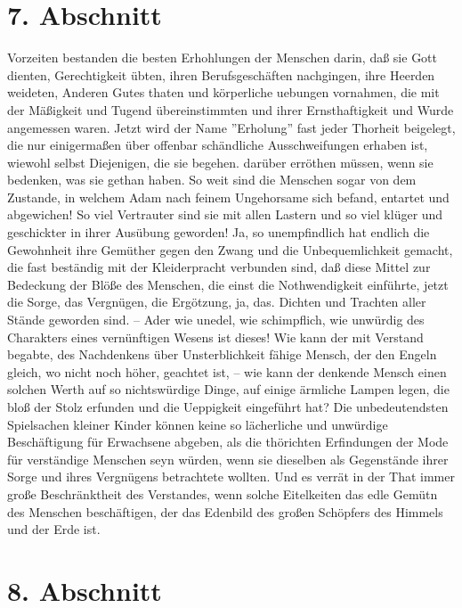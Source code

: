 \section{7. Abschnitt} \label{kap14_ab7}

Vorzeiten bestanden die besten Erhohlungen der Menschen darin, daß sie Gott
dienten, Gerechtigkeit übten, ihren Berufsgeschäften nachgingen, ihre Heerden
weideten, Anderen Gutes thaten und körperliche uebungen vornahmen, die mit der
Mäßigkeit und Tugend übereinstimmten und ihrer Ernsthaftigkeit und Wurde
angemessen waren. Jetzt wird der Name ''Erholung'' fast jeder Thorheit
beigelegt, die nur einigermaßen über offenbar schändliche Ausschweifungen
erhaben ist, wiewohl selbst Diejenigen, die sie begehen. darüber erröthen
müssen, wenn sie bedenken, was sie gethan haben. So weit sind die Menschen sogar
von dem Zustande, in welchem Adam nach feinem Ungehorsame sich befand, entartet
und abgewichen! So viel Vertrauter sind sie mit allen Lastern und so viel klüger
und geschickter in ihrer Ausübung geworden! Ja, so unempfindlich hat endlich die
Gewohnheit ihre Gemüther gegen den Zwang und die Unbequemlichkeit gemacht, die
fast beständig mit der Kleiderpracht verbunden sind, daß diese Mittel zur
Bedeckung der Blöße des Menschen, die einst die Nothwendigkeit einführte, jetzt
die Sorge, das Vergnügen, die Ergötzung, ja, das. Dichten und Trachten aller
Stände geworden sind. -- Ader wie unedel, wie schimpflich, wie unwürdig des
Charakters eines vernünftigen Wesens ist dieses! Wie kann der mit Verstand
begabte, des Nachdenkens über Unsterblichkeit fähige Mensch, der den Engeln
gleich, wo nicht noch höher, geachtet ist, -- wie kann der denkende Mensch einen
solchen Werth auf so nichtswürdige Dinge, auf einige ärmliche Lampen legen, die
bloß der Stolz erfunden und die Ueppigkeit eingeführt hat? Die unbedeutendsten
Spielsachen kleiner Kinder können keine so lächerliche und unwürdige
Beschäftigung für Erwachsene abgeben, als die thörichten Erfindungen der Mode
für verständige Menschen seyn würden, wenn sie dieselben als Gegenstände ihrer
Sorge und ihres Vergnügens betrachtete wollten. Und es verrät in der That immer
große Beschränktheit des Verstandes, wenn solche Eitelkeiten das edle Gemütn des
Menschen beschäftigen, der das Edenbild des großen Schöpfers des Himmels und der
Erde ist.

\section{8. Abschnitt} \label{kap14_ab8}

